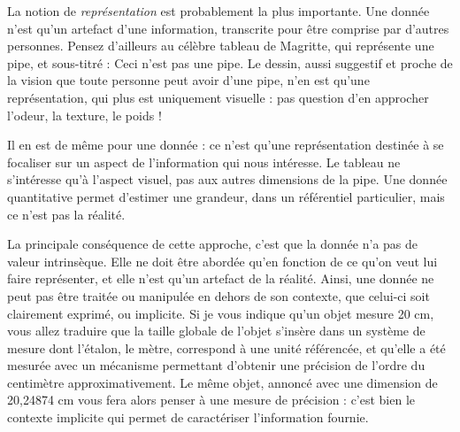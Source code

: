 \documentclass[10pt,a4paper,titlepage]{article}
\begin{document}
La notion de \textit{représentation} est probablement la plus importante. Une donnée n'est qu'un artefact d'une information, transcrite pour être comprise par d'autres personnes. Pensez d'ailleurs au célèbre tableau de Magritte, qui représente une pipe, et sous-titré : \og Ceci n'est pas une pipe\fg. Le dessin, aussi suggestif et proche de la vision que toute personne peut avoir d'une pipe, n'en est qu'une représentation, qui plus est uniquement visuelle : pas question d'en approcher l'odeur, la texture, le poids !

Il en est de même pour une donnée : ce n'est qu'une représentation destinée à se focaliser sur un aspect de l'information qui nous intéresse. Le tableau ne s'intéresse qu'à l'aspect visuel, pas aux autres dimensions de la pipe. Une donnée quantitative permet d'estimer une grandeur, dans un référentiel particulier, mais ce n'est pas la réalité.

La principale conséquence de cette approche, c'est que la donnée n'a pas de valeur intrinsèque. Elle ne doit être abordée qu'en fonction de ce qu'on veut lui faire représenter, et elle n'est qu'un artefact de la réalité.
Ainsi, une donnée ne peut pas être traitée ou manipulée en dehors de son contexte, que celui-ci soit clairement exprimé, ou implicite. Si je vous indique qu'un objet mesure 20 cm, vous allez traduire que la taille globale de l'objet s'insère dans un système de mesure dont l'étalon, le mètre, correspond à une unité référencée, et qu'elle a été mesurée avec un mécanisme permettant d'obtenir une précision de l'ordre du centimètre approximativement. Le même objet, annoncé avec une dimension de 20,24874 cm vous fera alors penser à une mesure de précision : c'est bien le contexte implicite qui permet de caractériser l'information fournie.




\end{document}

